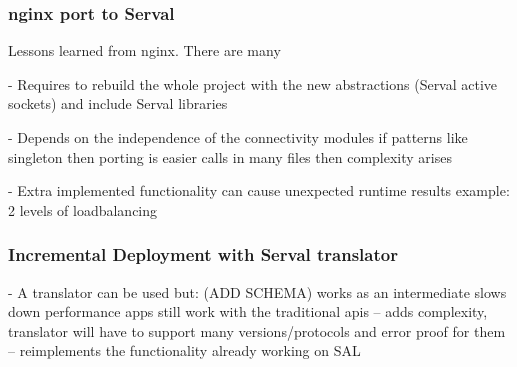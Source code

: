\subsubsection{nginx port to Serval}

Lessons learned from nginx.
There are many 

- Requires to rebuild the whole project with the new abstractions (Serval active sockets) and include Serval libraries

- Depends on the independence of the connectivity modules
if patterns like singleton then porting is easier
calls in many files then complexity arises

- Extra implemented functionality can cause unexpected runtime results
example: 2 levels of loadbalancing


\subsubsection{Incremental Deployment with Serval translator}

- A translator can be used but: (ADD SCHEMA)
works as an intermediate
slows down performance
apps still work with the traditional apis
 -- adds complexity, translator will have to support many versions/protocols and error proof for them
 -- reimplements the functionality already working on SAL